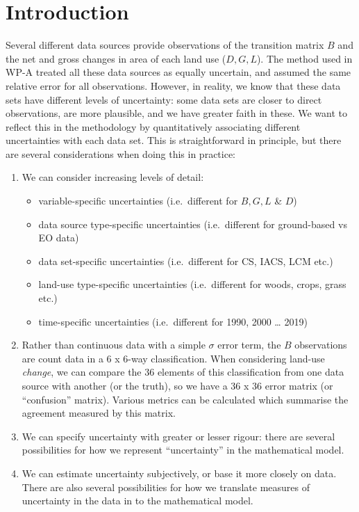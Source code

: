 \documentclass[
]{book}
\begin{document}
\hypertarget{introduction-1}{%
\section{Introduction}\label{introduction-1}}

Several different data sources provide observations of the transition matrix \(B\) and the net and gross changes in area of each land use (\(D, G, L\)). The method used in WP-A treated all these data sources as equally uncertain, and assumed the same relative error for all observations. However, in reality, we know that these data sets have different levels of uncertainty: some data sets are closer to direct observations, are more plausible, and we have greater faith in these. We want to reflect this in the methodology by quantitatively associating different uncertainties with each data set. This is straightforward in principle, but there are several considerations when doing this in practice:

\begin{enumerate}
\def\labelenumi{\arabic{enumi}.}
\item
  We can consider increasing levels of detail:

  \begin{itemize}
  \item
    variable-specific uncertainties (i.e.~different for \(B, G, L\) \& \(D\))
  \item
    data source type-specific uncertainties (i.e.~different for ground-based vs EO data)
  \item
    data set-specific uncertainties (i.e.~different for CS, IACS, LCM etc.)
  \item
    land-use type-specific uncertainties (i.e.~different for woods, crops, grass etc.)
  \item
    time-specific uncertainties (i.e.~different for 1990, 2000 \ldots{} 2019)
  \end{itemize}
\item
  Rather than continuous data with a simple \(\sigma\) error term, the \(B\) observations are count data in a 6 x 6-way classification. When considering land-use \emph{change}, we can compare the 36 elements of this classification from one data source with another (or the truth), so we have a 36 x 36 error matrix (or ``confusion'' matrix). Various metrics can be calculated which summarise the agreement measured by this matrix.
\item
  We can specify uncertainty with greater or lesser rigour: there are several possibilities for how we represent ``uncertainty'' in the mathematical model.
\item
  We can estimate uncertainty subjectively, or base it more closely on data. There are also several possibilities for how we translate measures of uncertainty in the data in to the mathematical model.
\end{enumerate}
\end{document}

